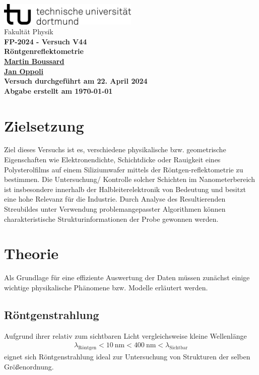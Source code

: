 \documentclass[12pt]{article}
\begin{document}
\begin{titlepage}
  \centering
  \vspace*{1cm}
  \includegraphics[width=0.5\textwidth]{Ressourcen/tud_logo_schwarz(RGB)}\\
  \vspace*{0.25cm}
  \large\textmd{Fakultät Physik} \\
  \vspace*{6cm}
  \huge \bfseries FP-2024 - Versuch V44\\
  \vspace*{0.25cm}
  \large Röntgenreflektometrie\\
  \vspace*{0.25cm}
  \large\textmd{\href{mailto:martin.boussard@tu-dortmund.de}{Martin Boussard}} \\
  \large\textmd{\href{mailto:jan.oppoli@tu-dortmund.de}{Jan Oppoli}} \\
  \vfill
  \small\textmd{Versuch durchgeführt am 22. April 2024}\\
  \small\textmd{Abgabe erstellt am \today}
\end{titlepage}
\tableofcontents 
\newpage

\section{Zielsetzung}\label{sec:zielsetzung}
Ziel dieses Versuchs ist es, verschiedene physikalische bzw. geometrische Eigenschaften wie Elektronendichte, Schichtdicke oder Rauigkeit eines Polysterolfilms auf einem Siliziumwafer mittels der Röntgen-reflektometrie zu bestimmen.
Die Untersuchung/ Kontrolle solcher Schichten im Nanometerbereich ist insbesondere innerhalb der Halbleiterelektronik von Bedeutung und besitzt eine hohe Relevanz für die Industrie.
Durch Analyse des Resultierenden Streubildes unter Verwendung problemangepasster Algorithmen können charakteristische Strukturinformationen der Probe gewonnen werden.
\section{Theorie}\label{sec:theorie}
Als Grundlage für eine effiziente Auswertung der Daten müssen zunächst einige wichtige physikalische Phänomene bzw. Modelle erläutert werden.
\subsection{Röntgenstrahlung}\label{subsec:röntgen}
Aufgrund ihrer relativ zum sichtbaren Licht vergleichsweise kleine Wellenlänge 
\begin{align*}
  \lambda_{\text{Röntgen}} < \SI{10}{\nano\meter} < \SI{400}{\nano\meter} <\lambda_\text{Sichtbar}
\end{align*}
eignet sich Röntgenstrahlung ideal zur Untersuchung von Strukturen der selben Größenordnung.
\end{document}
